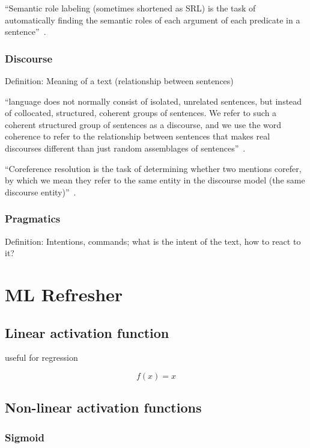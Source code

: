 \documentclass[11pt]{article}
\begin{document}
``Semantic role labeling (sometimes shortened as SRL) is the task of automatically finding the semantic roles of each argument of each predicate in a sentence''~\cite{book-speech-and-language-processing}.

\subsubsection{Discourse}

Definition: Meaning of a text (relationship between sentences)

``language does not normally consist of isolated, unrelated sentences, but instead of collocated, structured, coherent groups of sentences. We refer to such a coherent structured group of sentences as a discourse, and we use the word coherence to refer to the relationship between sentences that makes real discourses different than just random assemblages of sentences''~\cite{book-speech-and-language-processing}.

``Coreference resolution is the task of determining whether two mentions corefer, by which we mean they refer to the same entity in the discourse model (the same discourse entity)''~\cite{book-speech-and-language-processing}.

\subsubsection{Pragmatics}

Definition: Intentions, commands; what is the intent of the text, how to react to it?

\section{ML Refresher}

\subsection{Linear activation function}

useful for regression

\begin{equation}
    f(x)=x
\end{equation}

\subsection{Non-linear activation functions}

\subsubsection{Sigmoid}
\end{document}
